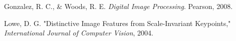 


\begin{thebibliography}{9}

    Gonzalez, R. C., \& Woods, R. E. \textit{Digital Image Processing}. Pearson, 2008.
    
    Lowe, D. G. "Distinctive Image Features from Scale-Invariant Keypoints," \textit{International Journal of Computer Vision}, 2004.
    
    \end{thebibliography}